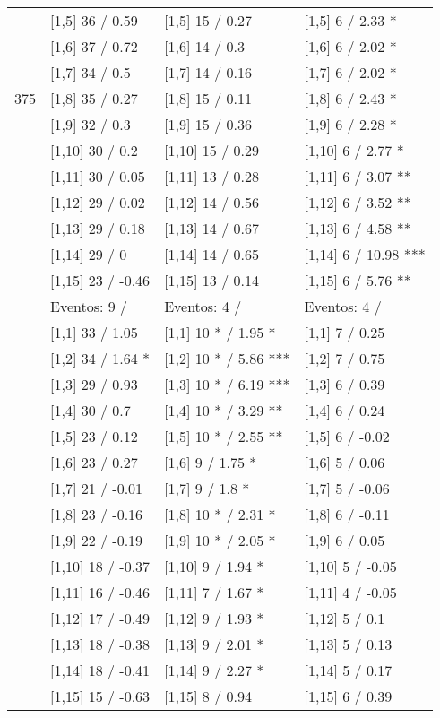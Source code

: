 \begin{table}
\begin{tabular}[t]{llll}
 & {}[1,5] 36  / 0.59 & {}[1,5] 15  / 0.27 & {}[1,5] 6  / 2.33 *\\
 & {}[1,6] 37  / 0.72 & {}[1,6] 14  / 0.3 & {}[1,6] 6  / 2.02 *\\
 & {}[1,7] 34  / 0.5 & {}[1,7] 14  / 0.16 & {}[1,7] 6  / 2.02 *\\
375 & {}[1,8] 35  / 0.27 & {}[1,8] 15  / 0.11 & {}[1,8] 6  / 2.43 *\\
\addlinespace
 & {}[1,9] 32  / 0.3 & {}[1,9] 15  / 0.36 & {}[1,9] 6  / 2.28 *\\
 & {}[1,10] 30  / 0.2 & {}[1,10] 15  / 0.29 & {}[1,10] 6  / 2.77 *\\
 & {}[1,11] 30  / 0.05 & {}[1,11] 13  / 0.28 & {}[1,11] 6  / 3.07 **\\
 & {}[1,12] 29  / 0.02 & {}[1,12] 14  / 0.56 & {}[1,12] 6  / 3.52 **\\
 & {}[1,13] 29  / 0.18 & {}[1,13] 14  / 0.67 & {}[1,13] 6  / 4.58 **\\
\addlinespace
 & {}[1,14] 29  / 0 & {}[1,14] 14  / 0.65 & {}[1,14] 6  / 10.98 ***\\
 & {}[1,15] 23  / -0.46 & {}[1,15] 13  / 0.14 & {}[1,15] 6  / 5.76 **\\
 & Eventos:  9 / & Eventos:  4 / & Eventos:  4 /\\
 & {}[1,1] 33  / 1.05 & {}[1,1] 10 * / 1.95 * & {}[1,1] 7  / 0.25\\
 & {}[1,2] 34  / 1.64 * & {}[1,2] 10 * / 5.86 *** & {}[1,2] 7  / 0.75\\
\addlinespace
 & {}[1,3] 29  / 0.93 & {}[1,3] 10 * / 6.19 *** & {}[1,3] 6  / 0.39\\
 & {}[1,4] 30  / 0.7 & {}[1,4] 10 * / 3.29 ** & {}[1,4] 6  / 0.24\\
 & {}[1,5] 23  / 0.12 & {}[1,5] 10 * / 2.55 ** & {}[1,5] 6  / -0.02\\
 & {}[1,6] 23  / 0.27 & {}[1,6] 9  / 1.75 * & {}[1,6] 5  / 0.06\\
 & {}[1,7] 21  / -0.01 & {}[1,7] 9  / 1.8 * & {}[1,7] 5  / -0.06\\
\addlinespace
500 & {}[1,8] 23  / -0.16 & {}[1,8] 10 * / 2.31 * & {}[1,8] 6  / -0.11\\
 & {}[1,9] 22  / -0.19 & {}[1,9] 10 * / 2.05 * & {}[1,9] 6  / 0.05\\
 & {}[1,10] 18  / -0.37 & {}[1,10] 9  / 1.94 * & {}[1,10] 5  / -0.05\\
 & {}[1,11] 16  / -0.46 & {}[1,11] 7  / 1.67 * & {}[1,11] 4  / -0.05\\
 & {}[1,12] 17  / -0.49 & {}[1,12] 9  / 1.93 * & {}[1,12] 5  / 0.1\\
\addlinespace
 & {}[1,13] 18  / -0.38 & {}[1,13] 9  / 2.01 * & {}[1,13] 5  / 0.13\\
 & {}[1,14] 18  / -0.41 & {}[1,14] 9  / 2.27 * & {}[1,14] 5  / 0.17\\
 & {}[1,15] 15  / -0.63 & {}[1,15] 8  / 0.94 & {}[1,15] 6  / 0.39\\
\bottomrule
\end{tabular}
\end{table}
